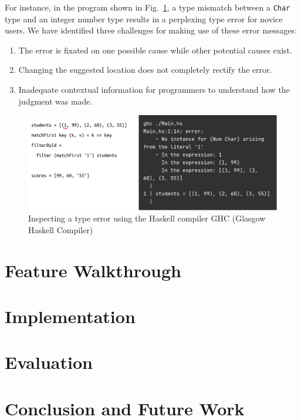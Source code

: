 For instance, in the program shown in Fig.~\ref{fig:motivation}, a type mismatch between a {\tt Char} type and an integer number type results in a perplexing type error for novice users. We have identified three challenges for making use of these error messages:


    \begin{enumerate}
        \item The error is fixated on one possible cause while other potential causes exist.
        \item Changing the suggested location does not completely rectify the error.
        \item Inadequate contextual information for programmers to understand how the judgment was made.

    \end{enumerate}


    \begin{figure}
        \centering
        \includegraphics[width=\linewidth]{Figures/motivation}
        \caption{Inspecting a type error using the Haskell compiler GHC (Glasgow Haskell Compiler)}
        \label{fig:motivation}
    \end{figure}


\section{Feature Walkthrough}

\section{Implementation}

\section{Evaluation}

\section{Conclusion and Future Work}